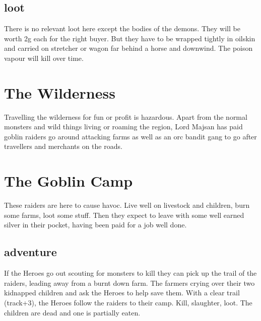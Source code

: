 \subsection*{loot}
There is no relevant loot here except the bodies of the demons. They will be worth 2g each for the right buyer. But they have to be wrapped tightly in oilskin and carried on stretcher or wagon far behind a horse and downwind. The poison vapour will kill over time.








\section*{The Wilderness}
Travelling the wilderness for fun or profit is hazardous. Apart from the normal monsters and wild things living or roaming the region, Lord Majsan has paid goblin raiders go around attacking farms as well as an orc bandit gang to go after travellers and merchants on the roads.







\section*{The Goblin Camp}
These raiders are here to cause havoc. Live well on livestock and children, burn some farms, loot some stuff. Then they expect to leave with some well earned silver in their pocket, having been paid for a job well done.


\subsection*{adventure}
If the Heroes go out scouting for monsters to kill they can pick up the trail of the raiders, leading away from a burnt down farm. The farmers crying over their two kidnapped children and ask the Heroes to help save them.
With a clear trail (track+3), the Heroes follow the raiders to their camp. Kill, slaughter, loot. The children are dead and one is partially eaten.


